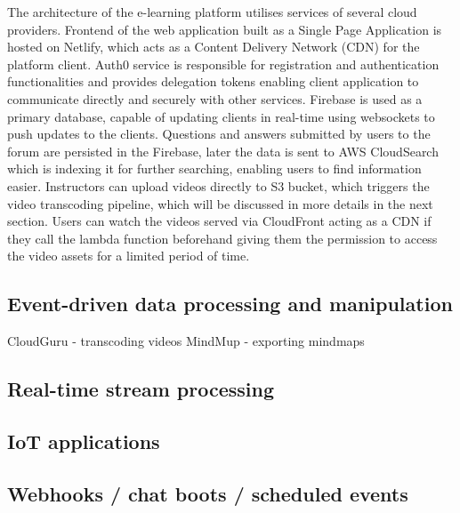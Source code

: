 The architecture of the e-learning platform utilises services of several cloud providers. Frontend of the web application built as a Single Page Application is hosted on Netlify, which acts as a Content Delivery Network (CDN) for the platform client. Auth0 service is responsible for registration and authentication functionalities and provides delegation tokens enabling client application to communicate directly and securely with other services. Firebase is used as a primary database, capable of updating clients in real-time using websockets to push updates to the clients. Questions and answers submitted by users to the forum are persisted in the Firebase, later the data is sent to AWS CloudSearch which is indexing it for further searching, enabling users to find information easier. Instructors can upload videos directly to S3 bucket, which triggers the video transcoding pipeline, which will be discussed in more details in the next section. Users can watch the videos served via CloudFront acting as a CDN if they call the lambda function beforehand giving them the permission to access the video assets for a limited period of time.

\subsection*{Event-driven data processing and manipulation}


CloudGuru - transcoding videos
MindMup - exporting mindmaps


\subsection*{Real-time stream processing}

\subsection*{IoT applications}

\subsection*{Webhooks / chat boots / scheduled events}

